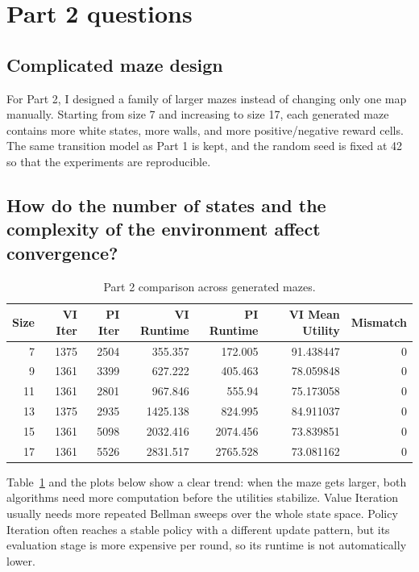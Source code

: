 \documentclass[11pt]{article}
\begin{document}
\section{Part 2 questions}

\subsection{Complicated maze design}
For Part 2, I designed a family of larger mazes instead of changing only one map manually. Starting from size 7 and increasing to size 17, each generated maze contains more white states, more walls, and more positive/negative reward cells. The same transition model as Part 1 is kept, and the random seed is fixed at 42 so that the experiments are reproducible.

\subsection{How do the number of states and the complexity of the environment affect convergence?}
\begin{table}[h]
\centering
\small
\begin{tabular}{rrrrrrr}
\toprule
Size & VI Iter & PI Iter & VI Runtime & PI Runtime & VI Mean Utility & Mismatch \\
\midrule
7 & 1375 & 2504 & 355.357 & 172.005 & 91.438447 & 0 \\
9 & 1361 & 3399 & 627.222 & 405.463 & 78.059848 & 0 \\
11 & 1361 & 2801 & 967.846 & 555.94 & 75.173058 & 0 \\
13 & 1375 & 2935 & 1425.138 & 824.995 & 84.911037 & 0 \\
15 & 1361 & 5098 & 2032.416 & 2074.456 & 73.839851 & 0 \\
17 & 1361 & 5526 & 2831.517 & 2765.528 & 73.081162 & 0 \\
\bottomrule
\end{tabular}
\caption{Part 2 comparison across generated mazes.}
\label{tab:part2_results}
\end{table}

Table~\ref{tab:part2_results} and the plots below show a clear trend: when the maze gets larger, both algorithms need more computation before the utilities stabilize. Value Iteration usually needs more repeated Bellman sweeps over the whole state space. Policy Iteration often reaches a stable policy with a different update pattern, but its evaluation stage is more expensive per round, so its runtime is not automatically lower.
\end{document}
